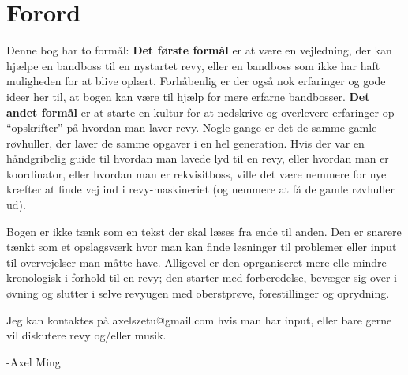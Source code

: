 \section{Forord}
Denne bog har to formål:
\textbf{Det første formål} er at være en vejledning, der kan hjælpe en bandboss til en nystartet revy, eller en bandboss som ikke har haft muligheden for at blive oplært.
Forhåbenlig er der også nok erfaringer og gode ideer her til, at bogen kan være til hjælp for mere erfarne bandbosser.
\textbf{Det andet formål} er at starte en kultur for at nedskrive og overlevere erfaringer op “opskrifter” på hvordan man laver revy. Nogle gange er det de samme gamle røvhuller, der laver de samme opgaver i en hel generation.
Hvis der var en håndgribelig guide til hvordan man lavede lyd til en revy, eller hvordan man er koordinator, eller hvordan man er rekvisitboss, ville det være nemmere for nye kræfter at finde vej ind i revy-maskineriet (og nemmere at få de gamle røvhuller ud).

Bogen er ikke tænk som en tekst der skal læses fra ende til anden. Den er snarere tænkt som et opslagsværk hvor man kan finde løsninger til problemer eller input til overvejelser man måtte have. Alligevel er den oprganiseret mere elle mindre kronologisk i forhold til en revy; den starter med forberedelse, bevæger sig over i øvning og slutter i selve revyugen med oberstprøve, forestillinger og oprydning.

Jeg kan kontaktes på axelszetu@gmail.com hvis man har input, eller bare gerne vil diskutere revy og/eller musik.

-Axel Ming
